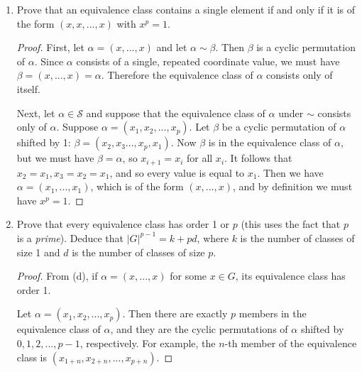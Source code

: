 \documentclass{article}
\begin{document}
\begin{enumerate}[label=(\alph*), itemsep=0em, start=2]
\begin{proof}
\begin{itemize}[itemsep=0em]
                \item Transitive: Let $\alpha \sim \beta$ and $\beta \sim \gamma$, with $\alpha, \beta$ as above and $\gamma$ indexed by $z$. We have $y_i = x_{i + n}$ and $z_i = y_{i + k}$ for some $k, n \in \mathbb{Z}$. It follows that $z_i = x_{i + k + n}$, which implies that $\gamma$ is a cyclic permutation of $\alpha$, so $\alpha \sim \gamma$.
            \end{itemize}
            Therefore $\sim$ is an equivalence relation on $\mathcal{S}$.
          \end{proof}
    \item Prove that an equivalence class contains a single element if and only if it is of the form $(x, x, ..., x)$ with $x^p = 1$.
          \begin{proof}
            First, let $\alpha = (x, ..., x)$ and let $\alpha \sim \beta$. Then $\beta$ is a cyclic permutation of $\alpha$. Since $\alpha$ consists of a single, repeated coordinate value, we must have $\beta = (x, ..., x) = \alpha$. Therefore the equivalence class of $\alpha$ consists only of itself.

            Next, let $\alpha \in \mathcal{S}$ and suppose that the equivalence class of $\alpha$ under $\sim$ consists only of $\alpha$. Suppose $\alpha = (x_1, x_2, ..., x_p)$. Let $\beta$ be a cyclic permutation of $\alpha$ shifted by 1: $\beta = (x_2, x_3..., x_p, x_1)$. Now $\beta$ is in the equivalence class of $\alpha$, but we must have $\beta = \alpha$, so $x_{i + 1} = x_i$ for all $x_i$. It follows that $x_2 = x_1, x_3 = x_2 = x_1$, and so every value is equal to $x_1$. Then we have $\alpha = (x_1, ..., x_1)$, which is of the form $(x, ..., x)$, and by definition we must have $x^p = 1$.
          \end{proof}
    \item Prove that every equivalence class has order 1 or $p$ (this uses the fact that $p$ is a \emph{prime}). Deduce that $|G|^{p - 1} = k + pd$, where $k$ is the number of classes of size 1 and $d$ is the number of classes of size $p$.
          \begin{proof}
            From (d), if $\alpha = (x, ..., x)$ for some $x \in G$, its equivalence class has order 1.

            Let $\alpha = (x_1, x_2, ..., x_p)$. Then there are exactly $p$ members in the equivalence class of $\alpha$, and they are the cyclic permutations of $\alpha$ shifted by $0, 1, 2, ..., p - 1$, respectively. For example, the $n$-th member of the equivalence class is $(x_{1 + n}, x_{2 + n}, ..., x_{p + n})$.


\end{proof}
\end{enumerate}
\end{document}
